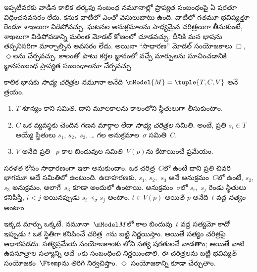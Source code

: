 \documentclass[../../../include/open-logic-section]{subfiles}
\begin{document}


ఇప్పటివరకు వాడిన కాలిక తర్కపు సంబంధ నమూనాల్లో ప్రాప్యత
సంబంధంపై ఏ షరతూ విధించనవసరం లేదు. కనుక వాటిలో ఎంతో
వెసులుబాటు ఉంది. వాటిలో గతమూ భవిష్యత్తూ రెండూ శాఖలుగా
విడిపోవచ్చు. ఘటనల అనుక్రమాలను సాధ్యమైన చరిత్రలుగా
తీసుకుంటే, శాఖలుగా విడిపోవడాన్ని మరింత మోడల్ కోణంలో చూడవచ్చు. దీనికి
మన భాషను తప్పనిసరిగా మార్చాల్సిన అవసరం లేదు. అయినా
``సాధారణ'' మోడల్ సంయోజకాలు $\Box$,~$\Diamond$లను
చేర్చవచ్చు. కాలంతో పాటు కర్తల జ్ఞానంలో వచ్చే మార్పులను
సూచించడానికి జ్ఞానసంబంధ ప్రాప్యత సంబంధాలనూ చేర్చవచ్చు.

\begin{defn}
  కాలిక భాషకు \emph{సాధ్య చరిత్రల నమూనా} అనేది
  $\mModel{M} = \tuple{T, C, V}$ అనే త్రయం.
  \begin{enumerate}
    \item $T$ శూన్యం కాని సమితి. దాని మూలకాలను కాలంలోని
      స్థితులుగా తీసుకుంటాం.
    \item $C$ ఒక వ్యవస్థకు చెందిన గణన మార్గాల లేదా
      \emph{సాధ్య చరిత్రల} సమితి. అంటే, ప్రతి
      $s_i \in T$ అయ్యే స్థితులు $s_1$, $s_2$,~$s_3$,
      \dots{} గల అనుక్రమాల~$\sigma$ సమితి~$C$.
    \item $V$ అనేది ప్రతి ~$p$ కాల బిందువుల సమితి~$V(p)$ను
      కేటాయించే ప్రమేయం.
  \end{enumerate}
  సరళత కోసం సాధారణంగా ఇలా అనుకుందాం.
  ఒక చరిత్ర~$C$లో ఉంటే దాని ప్రతి చివరి భాగమూ
  అదే సమితిలో ఉంటుంది. ఉదాహరణకు, $s_1$, $s_2$,~$s_3$
  అనే అనుక్రమం~$C$లో ఉంటే, $s_2$, $s_3$ అనుక్రమం,
  అలాగే~$s_3$ కూడా అందులో ఉంటాయి. అనుక్రమం~$\sigma$లో
  $s_i$,~$s_j$ రెండు స్థితులు కనిపిస్తే, $i < j$
  అయినప్పుడు $s_i \prec_\sigma s_j$ అంటాం.
  $t \in V(p)$ అయితే $p$ అనేది~$t$ వద్ద
  \emph{సత్యం} అంటాం.
\end{defn}

ఇక్కడ మార్పు ఒక్కటే. నమూనా~$\mModel M$లో కాల
బిందువు~$t$ వద్ద 
సత్యమో కాదో ఇప్పుడు $t$ ఒక స్థితిగా కనిపించే
చరిత్ర~$\sigma$ను బట్టి నిర్ణయిస్తాం. అయితే
 సత్యం చరిత్రపై ఆధారపడదు. సత్యప్రమేయ
సంయోజకాలకు లోని సత్య షరతులనే
వాడతాం; అయితే వాటి ఉపసూత్రాల సత్యాన్ని అదే~$\sigma$కు
సంబంధించి నిర్ణయించాలి. ఈ చరిత్రలను బట్టి భవిష్యత్
సంయోజకం~$\Ftemp$ను తిరిగి నిర్వచిస్తాం.
$\Diamond$ సంయోజకాన్ని కూడా చేర్చుతాం.
\end{document}
